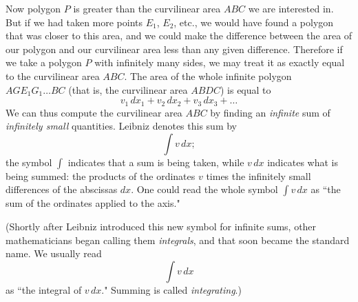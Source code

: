 \documentclass[polutonikogreek,english,twoside,openright]{article}
\begin{document}
Now polygon $P$ is greater than the curvilinear area $ABC$ we are
interested in.  But if we had taken more points $E_1$, $E_2$, etc., we
would have found a polygon that was closer to this area, and we could
make the difference between the area of our polygon and our
curvilinear area less than any given difference.  Therefore if we take
a polygon $P$ with infinitely many sides, we may treat it as exactly
equal to the curvilinear area $ABC$.  The area of the whole infinite
polygon $AGE_1G_1\ldots BC$ (that is, the curvilinear area $ABDC$) is
equal to
$$v_1\,dx_1 + v_2\,dx_2 + v_3\,dx_3 + \ldots$$
We can thus compute the curvilinear area $ABC$ by finding an {\em
  infinite} sum of {\em infinitely small} quantities.  Leibniz denotes
this sum by
$$\int\!v\,dx;$$
the symbol $\int$ indicates that a sum is being taken, while $v\,dx$
indicates what is being summed: the products of the ordinates $v$
times the infinitely small differences of the abscissas $dx$.  One
could read the whole symbol $\int\!v\,dx$ as ``the sum of the
ordinates applied to the axis."

(Shortly after Leibniz introduced this new symbol for infinite sums,
other mathematicians began calling them {\em integrals}, and that soon
became the standard name.  We usually read
$$\int\!v\,dx$$
as ``the integral of $v\,dx$."  Summing is called {\em integrating}.)

\end{document}
